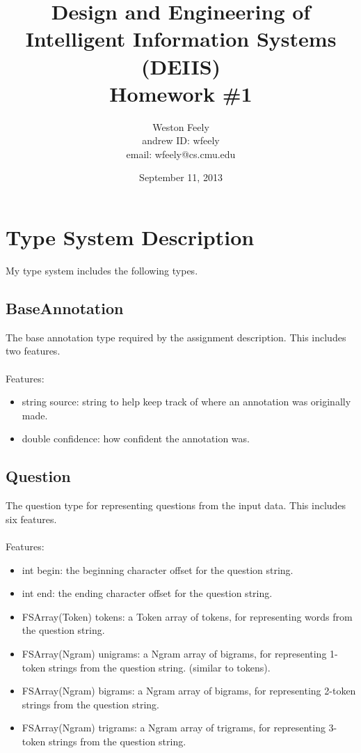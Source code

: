 \documentclass[11pt]{article}
\begin{document}
\title{\textbf{Design and Engineering of Intelligent Information Systems (DEIIS)}\\
	Homework \#1}
\author{Weston Feely \\ andrew ID: wfeely \\ email: wfeely@cs.cmu.edu}
\date{September 11, 2013}
\maketitle

\section*{Type System Description}
My type system includes the following types.

\subsection{BaseAnnotation}
The base annotation type required by the assignment description. This includes two features. \\ \\
Features:
\begin{itemize}
\item string source: string to help keep track of where an annotation was originally made.
\item double confidence: how confident the annotation was.
\end{itemize}

\subsection{Question}
The question type for representing questions from the input data. This includes six features. \\ \\
Features:
\begin{itemize}
\item int begin: the beginning character offset for the question string.
\item int end: the ending character offset for the question string.
\item FSArray(Token) tokens: a Token array of tokens, for representing words from the question string.
\item FSArray(Ngram) unigrams: a Ngram array of bigrams, for representing 1-token strings from the question 
string. (similar to tokens).
\item FSArray(Ngram) bigrams: a Ngram array of bigrams, for representing 2-token strings from the question 
string.
\item FSArray(Ngram) trigrams: a Ngram array of trigrams, for representing 3-token strings from the question 
string.
\end{itemize}
\end{document}
